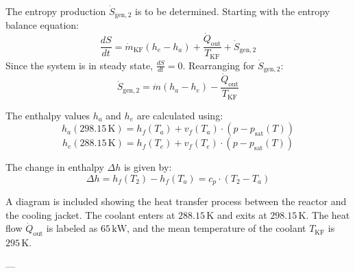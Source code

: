 The entropy production \( \dot{S}_{\text{gen},2} \) is to be determined. Starting with the entropy balance equation:  
\[
\frac{dS}{dt} = \dot{m}_{\text{KF}} (h_e - h_a) + \frac{\dot{Q}_{\text{out}}}{T_{\text{KF}}} + \dot{S}_{\text{gen},2}
\]  
Since the system is in steady state, \( \frac{dS}{dt} = 0 \). Rearranging for \( \dot{S}_{\text{gen},2} \):  
\[
\dot{S}_{\text{gen},2} = \dot{m} (h_a - h_e) - \frac{\dot{Q}_{\text{out}}}{T_{\text{KF}}}
\]  

The enthalpy values \( h_a \) and \( h_e \) are calculated using:  
\[
h_a(298.15 \, \text{K}) = h_f(T_a) + v_f(T_a) \cdot (p - p_{\text{sat}}(T))
\]  
\[
h_e(288.15 \, \text{K}) = h_f(T_e) + v_f(T_e) \cdot (p - p_{\text{sat}}(T))
\]  

The change in enthalpy \( \Delta h \) is given by:  
\[
\Delta h = h_f(T_2) - h_f(T_a) = c_p \cdot (T_2 - T_a)
\]  

A diagram is included showing the heat transfer process between the reactor and the cooling jacket. The coolant enters at \( 288.15 \, \text{K} \) and exits at \( 298.15 \, \text{K} \). The heat flow \( \dot{Q}_{\text{out}} \) is labeled as \( 65 \, \text{kW} \), and the mean temperature of the coolant \( T_{\text{KF}} \) is \( 295 \, \text{K} \).  

---